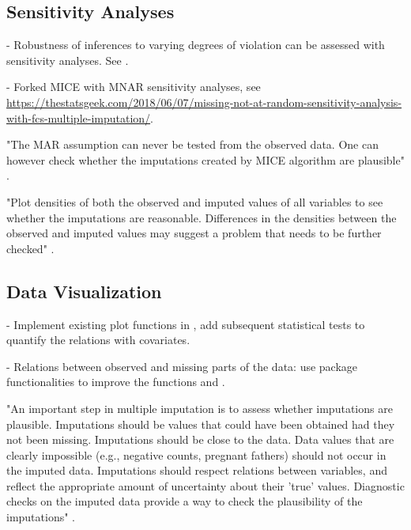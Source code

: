 \documentclass[article]{jss}
\newcommand{\fct}[1]{\code{#1()}}
\begin{document}
\subsection{Sensitivity Analyses} \label{sec:sensitivity}

- Robustness of inferences to varying degrees of violation can be assessed with sensitivity analyses. See \citep{nguy17}.

- Forked MICE with MNAR sensitivity analyses, see \url{https://thestatsgeek.com/2018/06/07/missing-not-at-random-sensitivity-analysis-with-fcs-multiple-imputation/}.

"The MAR assumption can never be tested from the observed data. One can however check whether the imputations created by MICE algorithm are plausible" \cite[p.~42]{mice}. 

"Plot densities of both the observed and imputed values of all variables to see whether the imputations are reasonable. Differences in the densities between the observed and imputed values may suggest a problem that needs to be further checked" \cite[p.~43]{mice}. 


\subsection{Data Visualization} \label{sec:visualization}

- Implement existing plot functions in , add subsequent statistical tests to quantify the relations with covariates.

- Relations between observed and missing parts of the data: use  package functionalities to improve the  functions \fct{hist} and \fct{xyplot}.

"An important step in multiple imputation is to assess whether imputations are plausible. Imputations should be values that could have been obtained had they not been missing. Imputations should be close to the data. Data values that are clearly impossible (e.g., negative counts, pregnant fathers) should not occur in the imputed data. Imputations should respect relations between variables, and reflect the appropriate amount of uncertainty about their 'true' values. Diagnostic checks on the imputed data provide a way to check the plausibility of the imputations" \cite[p.~11]{mice}.
\end{document}
